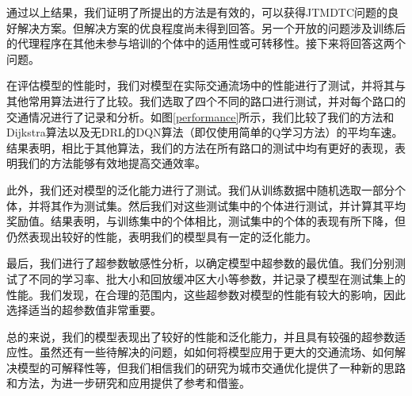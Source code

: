 通过以上结果，我们证明了所提出的方法是有效的，可以获得JTMDTC问题的良好解决方案。但解决方案的优良程度尚未得到回答。另一个开放的问题涉及训练后的代理程序在其他未参与培训的个体中的适用性或可转移性。接下来将回答这两个问题。

在评估模型的性能时，我们对模型在实际交通流场中的性能进行了测试，并将其与其他常用算法进行了比较。我们选取了四个不同的路口进行测试，并对每个路口的交通情况进行了记录和分析。如图\ref{performance}所示，我们比较了我们的方法和Dijkstra算法以及无DRL的DQN算法（即仅使用简单的Q学习方法）的平均车速。结果表明，相比于其他算法，我们的方法在所有路口的测试中均有更好的表现，表明我们的方法能够有效地提高交通效率。

此外，我们还对模型的泛化能力进行了测试。我们从训练数据中随机选取一部分个体，并将其作为测试集。然后我们对这些测试集中的个体进行测试，并计算其平均奖励值。结果表明，与训练集中的个体相比，测试集中的个体的表现有所下降，但仍然表现出较好的性能，表明我们的模型具有一定的泛化能力。

最后，我们进行了超参数敏感性分析，以确定模型中超参数的最优值。我们分别测试了不同的学习率、批大小和回放缓冲区大小等参数，并记录了模型在测试集上的性能。我们发现，在合理的范围内，这些超参数对模型的性能有较大的影响，因此选择适当的超参数值非常重要。

总的来说，我们的模型表现出了较好的性能和泛化能力，并且具有较强的超参数适应性。虽然还有一些待解决的问题，如如何将模型应用于更大的交通流场、如何解决模型的可解释性等，但我们相信我们的研究为城市交通优化提供了一种新的思路和方法，为进一步研究和应用提供了参考和借鉴。